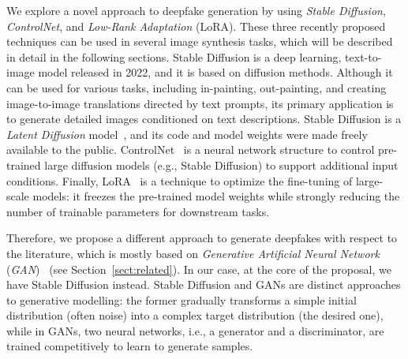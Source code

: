 \documentclass[preprint]{elsarticle}
\begin{document}
We  explore a novel approach to deepfake generation by using  \emph{Stable Diffusion}, \emph{ControlNet}, and \emph{Low-Rank Adaptation} (LoRA). These three recently proposed techniques can be used in several image synthesis tasks, which will be described in detail in the following sections. Stable Diffusion is a deep learning, text-to-image model released in 2022,  and it is based on diffusion methods. Although it can be used for various tasks, including in-painting, out-painting, and creating image-to-image translations directed by text prompts, its primary application is to generate detailed images conditioned on text descriptions. Stable Diffusion is a \emph{Latent Diffusion} model~\cite{rombach2022highresolution}, and its code and model weights were made freely available to the public.
ControlNet~\cite{zhang2023adding} is a neural network structure to control pre-trained large diffusion models (e.g., Stable Diffusion) to support additional input conditions. Finally, LoRA~\cite{hu2021lora} is a technique to optimize the fine-tuning of large-scale models: it freezes the pre-trained model weights while strongly reducing the number of trainable parameters for downstream tasks.

Therefore, we propose a different approach to generate deepfakes with respect to the literature, which is mostly based on \emph{Generative Artificial Neural Network} (\emph{GAN})~\cite{surveydgen1} (see Section~\ref{sect:related}). In our case, at the core of the proposal, we have Stable Diffusion instead. Stable Diffusion and GANs are distinct approaches to generative modelling: the former gradually transforms a simple initial distribution (often noise) into a complex target distribution (the desired one), while in GANs, two neural networks, i.e., a generator and a discriminator, are trained competitively  to learn to generate samples. 
\end{document}
